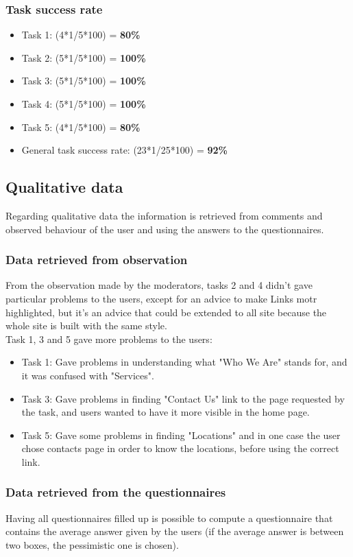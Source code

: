 \subsubsection{Task success rate}
\begin{itemize}
\item Task 1: (4*1/5*100) = \textbf{80\%}
\item Task 2: (5*1/5*100) = \textbf{100\%}
\item Task 3: (5*1/5*100) = \textbf{100\%}
\item Task 4: (5*1/5*100) = \textbf{100\%}
\item Task 5: (4*1/5*100) = \textbf{80\%}
\item General task success rate: (23*1/25*100) = \textbf{92\%}
\end{itemize}

\subsection{Qualitative data}
Regarding qualitative data the information is retrieved from comments and observed behaviour of the user and using the answers to the questionnaires.

\subsubsection{Data retrieved from observation}
From the observation made by the moderators, tasks 2 and 4 didn't gave particular problems to the users, except for an advice to make Links motr highlighted, but it's an advice that could be extended to all site because the whole site is built with the same style.\\
Task 1, 3 and 5 gave more problems to the users:
\begin{itemize}
\item Task 1: Gave problems in understanding what "Who We Are" stands for, and it was confused with "Services".
\item Task 3: Gave problems in finding "Contact Us" link to the page requested by the task, and users wanted to have it more visible in the home page.
\item Task 5: Gave some problems in finding "Locations" and in one case the user chose contacts page in order to know the locations, before using the correct link.
\end{itemize}

\subsubsection{Data retrieved from the questionnaires}
Having all questionnaires filled up is possible to compute a questionnaire that contains the average answer given by the users (if the average answer is between two boxes, the pessimistic one is chosen).

